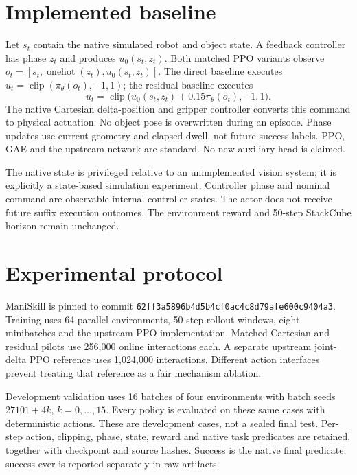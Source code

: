 \documentclass[10pt,a4paper]{article}
\begin{document}
\section{Implemented baseline}
Let $s_t$ contain the native simulated robot and object state. A feedback
controller has phase $z_t$ and produces $u_0(s_t,z_t)$. Both matched PPO variants
observe $o_t=[s_t,\operatorname{onehot}(z_t),u_0(s_t,z_t)]$. The direct baseline
executes $u_t=\operatorname{clip}(\pi_\theta(o_t),-1,1)$; the residual baseline
executes
\[
 u_t=\operatorname{clip}\bigl(u_0(s_t,z_t)+0.15\pi_\theta(o_t),-1,1\bigr).
\]
The native Cartesian delta-position and gripper controller converts this command
to physical actuation. No object pose is overwritten during an episode. Phase
updates use current geometry and elapsed dwell, not future success labels. PPO,
GAE and the upstream network are standard. No new auxiliary head is claimed.

The native state is privileged relative to an unimplemented vision system; it
is explicitly a state-based simulation experiment. Controller phase and nominal
command are observable internal controller states. The actor does not receive
future suffix execution outcomes. The environment reward and 50-step StackCube
horizon remain unchanged.

\section{Experimental protocol}
ManiSkill is pinned to commit
\texttt{62ff3a5896b4d5b4cf0ac4c8d79afe600c9404a3}. Training uses 64 parallel
environments, 50-step rollout windows, eight minibatches and the upstream PPO
implementation. Matched Cartesian and residual pilots use 256,000 online
interactions each. A separate upstream joint-delta PPO reference uses 1,024,000
interactions. Different action interfaces prevent treating that reference as a
fair mechanism ablation.

Development validation uses 16 batches of four environments with batch seeds
$27101+4k$, $k=0,\ldots,15$. Every policy is evaluated on these same cases with
deterministic actions. These are development cases, not a sealed final test.
Per-step action, clipping, phase, state, reward and native task predicates are
retained, together with checkpoint and source hashes. Success is the native final
predicate; success-ever is reported separately in raw artifacts.
\end{document}
